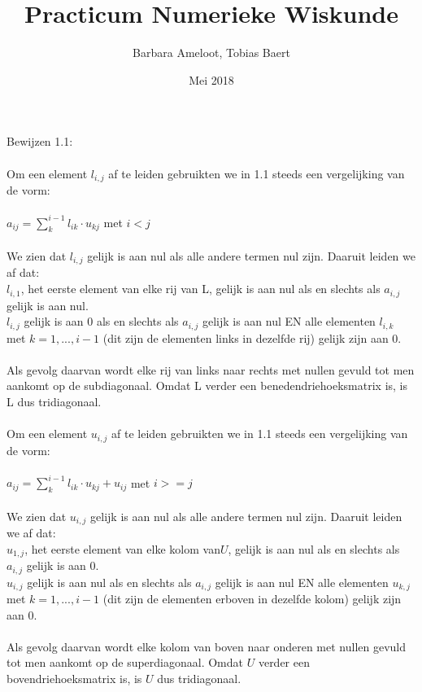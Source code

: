 \documentclass[a4paper]{article}
\title{Practicum Numerieke Wiskunde}
\author{Barbara Ameloot, Tobias Baert}
\date{Mei 2018}
\begin{document}
\maketitle
Bewijzen 1.1:
\\{}
\\Om een element  $l_{i,j}$ af te leiden gebruikten we in 1.1 steeds een vergelijking van de vorm:
\\{}
\\$a_{ij} = \sum_k^{i-1} {l_{ik}\cdot u_{kj}}$ met $ i < j$ 
\\{}
\\We zien dat $l_{i,j}$ gelijk is aan nul als alle andere termen nul zijn. Daaruit leiden we af dat:
\\ \textbullet{ } $l_{i,1}$, het eerste element van elke rij van L, gelijk is aan nul als en slechts als $a_{i,j}$ gelijk is aan nul.
\\ \textbullet { } $ l_{i,j}$ gelijk is aan 0 als en slechts als $a_{i,j}$ gelijk is aan nul EN alle elementen $l_{i,k}$ met $k = 1, ..., i - 1$ (dit zijn de elementen links in dezelfde rij) gelijk zijn aan 0.
\\{}
\\Als gevolg daarvan wordt elke rij van links naar rechts met nullen gevuld tot men aankomt op de subdiagonaal. Omdat L verder een benedendriehoeksmatrix is, is L dus tridiagonaal.
\\{}
\\Om een element $u_{i,j}$ af te leiden gebruikten we in 1.1 steeds een vergelijking van de vorm:
\\{}
\\$a_{ij} = \sum_k^{i-1} {l_{ik}\cdot u_{kj}} + u_{ij}$ met $ i >= j $
\\{}
\\We zien dat $u_{i,j}$ gelijk is aan nul als alle andere termen nul zijn. Daaruit leiden we af dat:
\\ \textbullet{ } $u_{1,j}$, het eerste element van elke kolom van$ U$, gelijk is aan nul als en slechts als $a_{i,j}$ gelijk is aan 0.
\\ \textbullet{ } $u_{i,j}$ gelijk is aan nul als en slechts als $a_{i,j}$ gelijk is aan nul EN alle elementen $u_{k,j}$ met $k = 1, ..., i - 1$ (dit zijn de elementen erboven in dezelfde kolom) gelijk zijn aan 0.
\\{}
\\Als gevolg daarvan wordt elke kolom van boven naar onderen met nullen gevuld tot men aankomt op de superdiagonaal. Omdat $U$ verder een bovendriehoeksmatrix is, is $U$ dus tridiagonaal.
\end{document}
